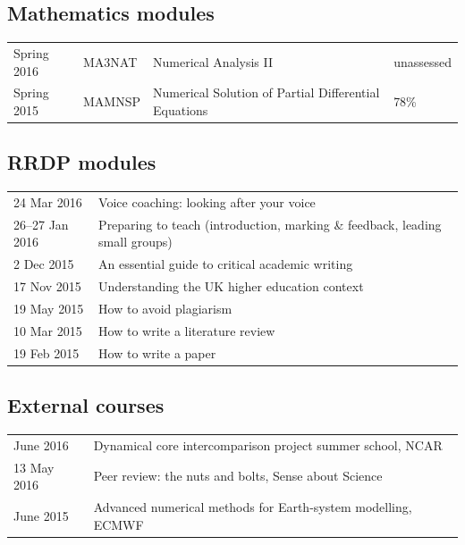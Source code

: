 \documentclass[a4paper,11pt]{article}
\begin{document}
\footnotesize{
\subsection*{Mathematics modules}
\begin{tabular}{l l l l}
Spring 2016	& MA3NAT & Numerical Analysis II & unassessed \\
Spring 2015	& MAMNSP & Numerical Solution of Partial Differential Equations  & 78\% \\
\end{tabular}

\subsection*{RRDP modules}
\begin{tabular}{l l}
24 Mar 2016	& Voice coaching: looking after your voice \\
26--27 Jan 2016 & Preparing to teach (introduction, marking \& feedback, leading small groups) \\
2 Dec 2015	& An essential guide to critical academic writing \\
17 Nov 2015	& Understanding the UK higher education context \\
19 May 2015	& How to avoid plagiarism \\
10 Mar 2015	& How to write a literature review \\
19 Feb 2015	& How to write a paper \\
\end{tabular}

\subsection*{External courses}
\begin{tabular}{l l}
June 2016 & Dynamical core intercomparison project summer school, NCAR \\
13 May 2016 & Peer review: the nuts and bolts, Sense about Science \\
June 2015 & Advanced numerical methods for Earth-system modelling, ECMWF \\
\end{tabular}

}
\end{document}
